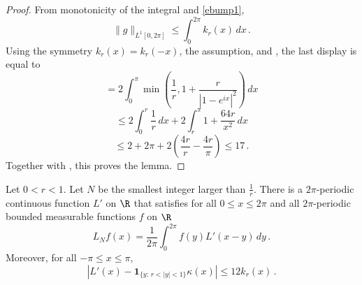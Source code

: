 \begin{proof}
\leanok
From monotonicity of the integral and \eqref{ebump1},
\begin{equation}
    \|g\|_{L^1[0, 2\pi]} \le \int_0^{2\pi}k_r(x)\, dx\,.
\end{equation}
Using the symmetry
$k_r(x)=k_r(-x)$, the assumption, and , the last display
is equal to
\begin{equation*}
    = 2 \int_0^\pi \min\left(\frac 1r, 1+\frac r{|1-e^{ix}|^2}\right)\, dx
\end{equation*}
\begin{equation*}
    \le 2\int_0^{r} \frac 1r \, dx+2\int_r^{\pi}1+\frac {64r}{x^2}\, dx
\end{equation*}
\begin{equation}
    \le 2+2\pi + 2\left(\frac {4r}r-\frac {4r}{\pi}\right)
    \le 17\, .
\end{equation}
    Together with , this proves the lemma.
\end{proof}

\begin{lemma}\label{Dirichlet-approximation}
\leanok
{}
Let $0<r<1$. Let $N$ be the smallest
integer larger than $\frac 1r$.
There is a $2\pi$-periodic continuous function
 ${L'}$ on $\R$ that satisfies for all $0\le x\le 2\pi$
and all $2\pi$-periodic bounded measurable functions $f$ on $\R$
\begin{equation}\label{lthroughlprime}
    L_Nf(x)=\frac 1{2\pi}\int_{0}^{2\pi}f(y) {L'}(x-y)\, dy\,.
\end{equation}
Moreover, for all $-\pi \le x \le \pi$,
\begin{equation}\label{eqdifflhil}
    \left|L'(x)-\mathbf{1}_{\{y:\, r<|y|<1\}} \kappa(x)\right|\le 12 k_r(x)\, .
\end{equation}
\end{lemma}


